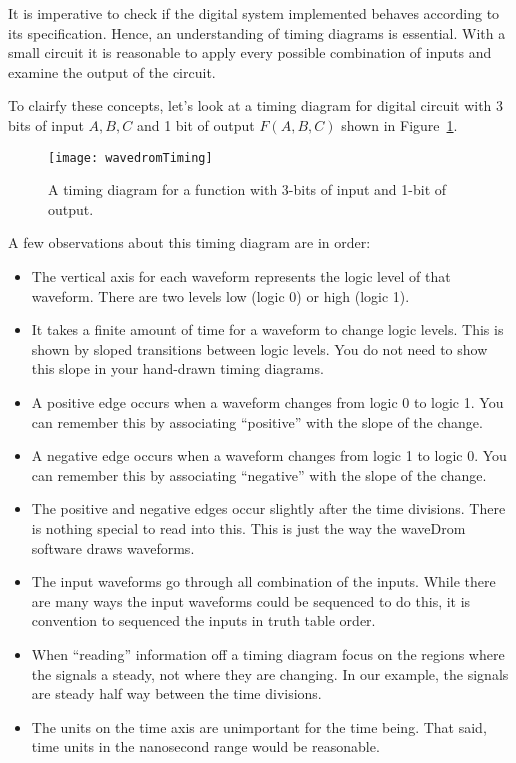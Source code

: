 It is imperative to check if the digital system implemented
behaves according to its specification. Hence, an understanding of
timing diagrams is essential.  With a small circuit it is reasonable
to apply every possible combination of inputs and examine the
output of the circuit.

To clairfy these concepts, let's look at a timing diagram for digital circuit
with 3 bits of input $A, B, C$ and 1 bit of output $F(A,B,C)$ shown in
Figure~\ref{fig:represenationsTime}.

\begin{figure}[ht]
\texttt{[image: wavedromTiming]}
\caption{A timing diagram for a function with 3-bits of input and 1-bit of output.}
\label{fig:represenationsTime}
\end{figure}

A few observations about this timing diagram are in order:
\begin{itemize}
\item The vertical axis for each waveform represents the logic level of that
waveform.  There are two levels low (logic 0) or high (logic 1).

\item It takes a finite amount of time for a waveform to change logic
levels.  This is shown by sloped transitions between logic levels.  You do
not need to show this slope in your hand-drawn timing diagrams.

\item A positive edge occurs when a waveform changes from logic 0 to logic 1.
You can remember this by associating ``positive'' with the slope of the change.

\item A negative edge occurs when a waveform changes from logic 1 to logic 0.
You can remember this by associating ``negative'' with the slope of the change.

\item The positive and negative edges occur slightly after the time divisions.
There is nothing special to read into this. This is just the way the waveDrom software
draws waveforms.

\item The input waveforms go through all combination of the inputs.
While there are many ways the input waveforms could be sequenced
to do this, it is convention to sequenced the inputs in truth table order.

\item When ``reading'' information off a timing diagram focus on
the regions where the signals a steady, not where they are changing.
In our example, the signals are steady half way between the time
divisions.

\item The units on the time axis are unimportant for the time being.
That said, time units in the nanosecond range would be reasonable.
\end{itemize}

